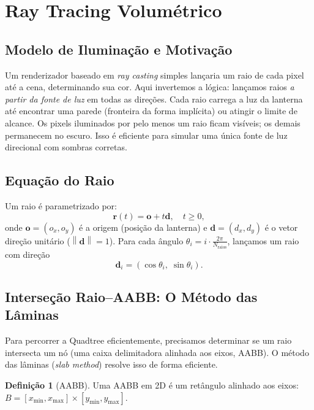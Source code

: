 \documentclass[11pt,a4paper]{article}
\theoremstyle{plain}
\theoremstyle{definition}
\newtheorem{definition}[theorem]{Definição}
\newcommand{\vv}[1]{\mathbf{#1}}
\newcommand{\norm}[1]{\left\|#1\right\|}
\begin{document}
\section{Ray Tracing Volumétrico}
\label{sec:raytracing}

\subsection{Modelo de Iluminação e Motivação}

\begin{tcolorbox}[motivacao]
Um renderizador baseado em \emph{ray casting} simples lançaria um raio de cada
pixel até a cena, determinando sua cor. Aqui invertemos a lógica: lançamos raios
\emph{a partir da fonte de luz} em todas as direções. Cada raio carrega a luz
da lanterna até encontrar uma parede (fronteira da forma implícita) ou atingir
o limite de alcance. Os pixels iluminados por pelo menos um raio ficam visíveis;
os demais permanecem no escuro. Isso é eficiente para simular uma única fonte
de luz direcional com sombras corretas.
\end{tcolorbox}

\subsection{Equação do Raio}

Um raio é parametrizado por:
\[
    \vv{r}(t) = \vv{o} + t \vv{d}, \quad t \geq 0,
\]
onde $\vv{o} = (o_x, o_y)$ é a origem (posição da lanterna) e
$\vv{d} = (d_x, d_y)$ é o vetor direção unitário ($\norm{\vv{d}} = 1$). Para
cada ângulo $\theta_i = i \cdot \frac{2\pi}{N_{\text{raios}}}$, lançamos um raio
com direção
\[
    \vv{d}_i = (\cos\theta_i,\; \sin\theta_i).
\]

\subsection{Interseção Raio--AABB: O Método das Lâminas}
\label{subsec:aabb}

Para percorrer a Quadtree eficientemente, precisamos determinar se um raio
intersecta um nó (uma caixa delimitadora alinhada aos eixos, AABB). O método
das lâminas (\textit{slab method}) resolve isso de forma eficiente.

\begin{definition}[AABB]
Uma AABB em 2D é um retângulo alinhado aos eixos:
$B = [x_{\min}, x_{\max}] \times [y_{\min}, y_{\max}]$.
\end{definition}
\end{document}
